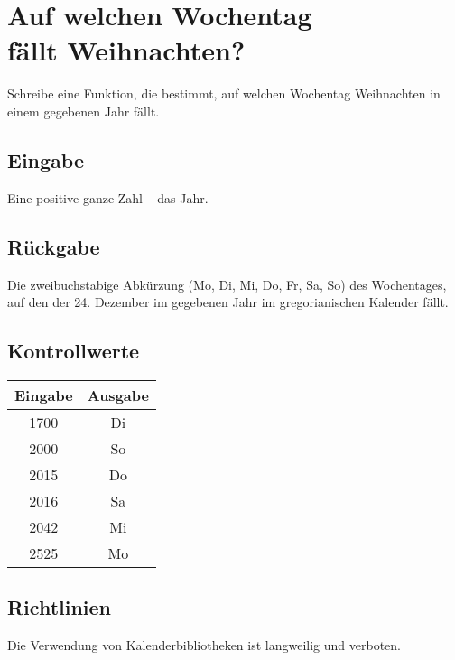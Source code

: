 \documentclass[a4paper, 17 pt]{extarticle}
\begin{document}
\section{Auf welchen Wochentag\\ fällt Weihnachten?}

Schreibe eine Funktion, die bestimmt, auf welchen Wochentag Weihnachten in einem gegebenen Jahr fällt.

\subsection{Eingabe}

Eine positive ganze Zahl – das Jahr.

\subsection{Rückgabe}

Die zweibuchstabige Abkürzung (Mo, Di, Mi, Do, Fr, Sa, So) des Wochentages, auf den der 24. Dezember im gegebenen Jahr im gregorianischen Kalender fällt.

\subsection{Kontrollwerte}

\renewcommand{\arraystretch}{1.3}
\begin{tabular}{c c}
	Eingabe & Ausgabe \\\hline
	1700 & Di \\
	2000 & So \\
	2015 & Do \\
	2016 & Sa \\
	2042 & Mi \\
	2525 & Mo \\
\end{tabular}

\subsection{Richtlinien}
Die Verwendung von Kalenderbibliotheken ist langweilig und verboten.
\end{document}
